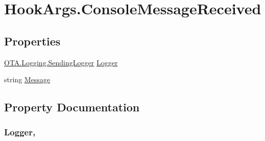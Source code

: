 \hypertarget{structOTA_1_1Plugin_1_1HookArgs_1_1ConsoleMessageReceived}{}\section{Hook\+Args.\+Console\+Message\+Received}
\label{structOTA_1_1Plugin_1_1HookArgs_1_1ConsoleMessageReceived}
\subsection*{Properties}
\begin{DoxyCompactItemize}
\item 
\hyperlink{namespaceOTA_1_1Logging_a489c780cb72d9452216c06b7a0eec2a6}{O\+T\+A.\+Logging.\+Sending\+Logger} \hyperlink{structOTA_1_1Plugin_1_1HookArgs_1_1ConsoleMessageReceived_a17b378bc75eea3d7c566a2b13b298855}{Logger}
\item 
string \hyperlink{structOTA_1_1Plugin_1_1HookArgs_1_1ConsoleMessageReceived_a40e8debace0cc6f4f7baa0fdd309c103}{Message}
\end{DoxyCompactItemize}


\subsection{Property Documentation}
\hypertarget{structOTA_1_1Plugin_1_1HookArgs_1_1ConsoleMessageReceived_a17b378bc75eea3d7c566a2b13b298855}{}
\subsubsection[{Logger}]{ Logger\hspace{0.3cm}{\ttfamily [get]}, {\ttfamily [set]}}\label{structOTA_1_1Plugin_1_1HookArgs_1_1ConsoleMessageReceived_a17b378bc75eea3d7c566a2b13b298855}
\hypertarget{structOTA_1_1Plugin_1_1HookArgs_1_1ConsoleMessageReceived_a40e8debace0cc6f4f7baa0fdd309c103}{}
